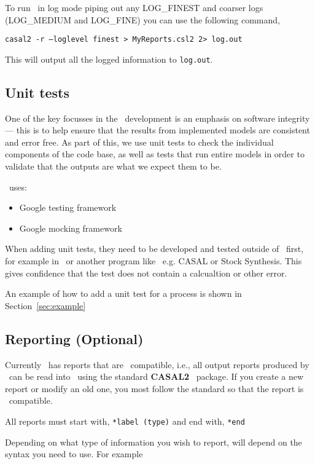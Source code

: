 To run \CNAME\ in log mode piping out any LOG\_FINEST and coarser logs (LOG\_MEDIUM and LOG\_FINE) you can use the following command,

\texttt{casal2 -r --loglevel finest > MyReports.csl2 2> log.out}

This will output all the logged information to \texttt{log.out}.

\subsection{Unit tests}

One of the key focusses in the \CNAME\ development is an emphasis on software integrity --- this is to help ensure that the results from implemented models are consistent and error free. As part of this, we use unit tests to check the individual components of the code base, as well as tests that run entire models in order to validate that the outputs are what we expect them to be.

\CNAME\ uses:
\begin{itemize}
	\item Google testing framework
	\item Google mocking framework
\end{itemize}

When adding unit tests, they need to be developed and tested outside of \CNAME\  first, for example in \R\ or another program like \CNAME\ e.g. CASAL or Stock Synthesis. This gives confidence that the test does not contain a calcualtion or other error. 

An example of how to add a unit test for a process is shown in Section~\ref{sec:example}

\subsection{Reporting (Optional)}

Currently \CNAME\ has reports that are \R\ compatible, i.e., all output reports produced by \CNAME\ can be read into \R\ using the standard  \textbf{CASAL2} \R\ package. If you create a new report or modify an old one, you most follow the standard so that the report is \R\ compatible.

All reports must start with,
\texttt{*label (type)}
and end with,
\texttt{*end}

Depending on what type of information you wish to report, will depend on the syntax you need to use. For example

